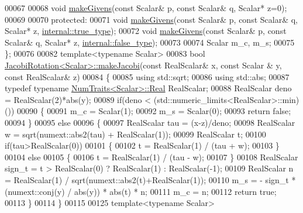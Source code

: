 \begin{DoxyCode}
00067 
00068     \textcolor{keywordtype}{void} \hyperlink{group___jacobi___module_af73c81e9cc139b7e0d877ce553b02ec0}{makeGivens}(\textcolor{keyword}{const} Scalar& p, \textcolor{keyword}{const} Scalar& q, Scalar* z=0);
00069 
00070   \textcolor{keyword}{protected}:
00071     \textcolor{keywordtype}{void} \hyperlink{group___jacobi___module_af73c81e9cc139b7e0d877ce553b02ec0}{makeGivens}(\textcolor{keyword}{const} Scalar& p, \textcolor{keyword}{const} Scalar& q, Scalar* z, 
      \hyperlink{struct_eigen_1_1internal_1_1true__type}{internal::true\_type});
00072     \textcolor{keywordtype}{void} \hyperlink{group___jacobi___module_af73c81e9cc139b7e0d877ce553b02ec0}{makeGivens}(\textcolor{keyword}{const} Scalar& p, \textcolor{keyword}{const} Scalar& q, Scalar* z, 
      \hyperlink{struct_eigen_1_1internal_1_1false__type}{internal::false\_type});
00073 
00074     Scalar m\_c, m\_s;
00075 \};
00076 
00082 \textcolor{keyword}{template}<\textcolor{keyword}{typename} Scalar>
00083 \textcolor{keywordtype}{bool} \hyperlink{group___jacobi___module_a69076401f22e883dc76b6ff9074ac669}{JacobiRotation<Scalar>::makeJacobi}(\textcolor{keyword}{const} RealScalar& x, \textcolor{keyword}{const} Scalar
      & y, \textcolor{keyword}{const} RealScalar& z)
00084 \{
00085   \textcolor{keyword}{using} std::sqrt;
00086   \textcolor{keyword}{using} std::abs;
00087   \textcolor{keyword}{typedef} \textcolor{keyword}{typename} \hyperlink{group___core___module_struct_eigen_1_1_num_traits}{NumTraits<Scalar>::Real} RealScalar;
00088   RealScalar deno = RealScalar(2)*abs(y);
00089   \textcolor{keywordflow}{if}(deno < (std::numeric\_limits<RealScalar>::min)())
00090   \{
00091     m\_c = Scalar(1);
00092     m\_s = Scalar(0);
00093     \textcolor{keywordflow}{return} \textcolor{keyword}{false};
00094   \}
00095   \textcolor{keywordflow}{else}
00096   \{
00097     RealScalar tau = (x-z)/deno;
00098     RealScalar w = sqrt(numext::abs2(tau) + RealScalar(1));
00099     RealScalar t;
00100     \textcolor{keywordflow}{if}(tau>RealScalar(0))
00101     \{
00102       t = RealScalar(1) / (tau + w);
00103     \}
00104     \textcolor{keywordflow}{else}
00105     \{
00106       t = RealScalar(1) / (tau - w);
00107     \}
00108     RealScalar sign\_t = t > RealScalar(0) ? RealScalar(1) : RealScalar(-1);
00109     RealScalar n = RealScalar(1) / sqrt(numext::abs2(t)+RealScalar(1));
00110     m\_s = - sign\_t * (numext::conj(y) / abs(y)) * abs(t) * n;
00111     m\_c = n;
00112     \textcolor{keywordflow}{return} \textcolor{keyword}{true};
00113   \}
00114 \}
00115 
00125 \textcolor{keyword}{template}<\textcolor{keyword}{typename} Scalar>

\end{DoxyCode}
